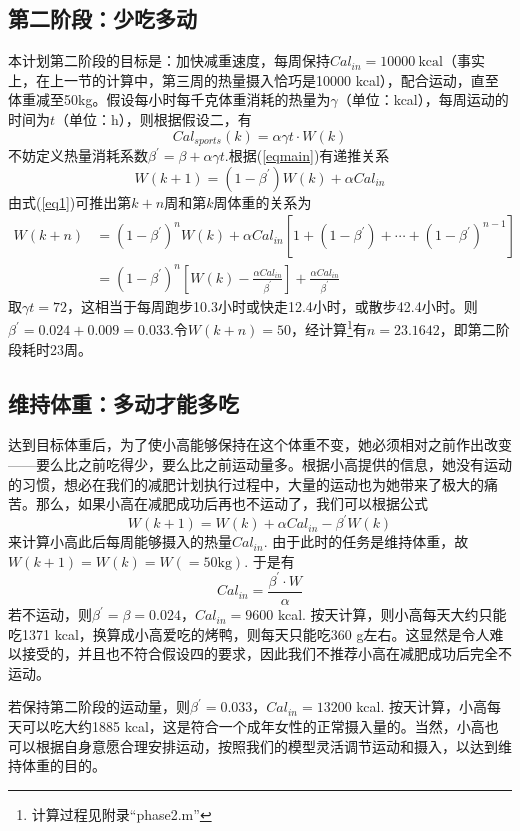 \documentclass[a4paper,12pt,onecolumn,twoside]{article}
\begin{document}
\subsection{第二阶段：少吃多动}\label{sensi:phase2}
本计划第二阶段的目标是：加快减重速度，每周保持$Cal_{in}=10000~\text{kcal}$（事实上，在上一节的计算中，第三周的热量摄入恰巧是10000 kcal），配合运动，直至体重减至50kg。假设每小时每千克体重消耗的热量为$\gamma$（单位：kcal），每周运动的时间为$t$（单位：h），则根据假设二，有
\begin{equation}
	Cal_{sports}(k)=\alpha\gamma t\cdot W(k)
\end{equation}
不妨定义热量消耗系数$\beta^{\prime}=\beta+\alpha\gamma t. $根据(\ref{eqmain})有递推关系
\begin{equation}\label{eq1}
	W(k+1)=(1-\beta^{\prime})W(k)+\alpha Cal_{in}
\end{equation}
由式(\ref{eq1})可推出第$k+n$周和第$k$周体重的关系为
\begin{equation}\label{sensi:2}
	\begin{aligned}
		W(k+n)&=(1-\beta^{\prime})^{n}W(k)+\alpha Cal_{in}[1+(1-\beta^{\prime})+\cdots+(1-\beta^{\prime})^{n-1}]\\
		&=(1-\beta^{\prime})^{n}[W(k)-\frac{\alpha Cal_{in}}{\beta^{\prime}}]+\frac{\alpha Cal_{in}}{\beta^{\prime}}
	\end{aligned}
\end{equation}
取$\gamma t=72$，这相当于每周跑步10.3小时或快走12.4小时，或散步42.4小时。则$\beta^{\prime}=0.024+0.009=0.033$.令$W(k+n)=50$，经计算\footnote{计算过程见附录“phase2.m”}有$n=23.1642$，即第二阶段耗时23周。

\subsection{维持体重：多动才能多吃}
达到目标体重后，为了使小高能够保持在这个体重不变，她必须相对之前作出改变——要么比之前吃得少，要么比之前运动量多。根据小高提供的信息，她没有运动的习惯，想必在我们的减肥计划执行过程中，大量的运动也为她带来了极大的痛苦。那么，如果小高在减肥成功后再也不运动了，我们可以根据公式
\begin{equation}
	W(k+1)=W(k)+\alpha Cal_{in}-\beta^{\prime}W(k)
\end{equation}
来计算小高此后每周能够摄入的热量$Cal_{in}.$ 由于此时的任务是维持体重，故$W(k+1)=W(k)=W(=50\text{kg}).$ 于是有
\begin{equation}
	Cal_{in}=\frac{\beta^{\prime}\cdot W}{\alpha}
\end{equation}
若不运动，则$\beta^{\prime}=\beta=0.024$，$Cal_{in}=9600$ kcal. 按天计算，则小高每天大约只能吃1371 kcal，换算成小高爱吃的烤鸭，则每天只能吃360 g左右。这显然是令人难以接受的，并且也不符合假设四的要求，因此我们不推荐小高在减肥成功后完全不运动。 \par
若保持第二阶段的运动量，则$\beta^{\prime}=0.033$，$Cal_{in}=13200$ kcal. 按天计算，小高每天可以吃大约1885 kcal，这是符合一个成年女性的正常摄入量的。当然，小高也可以根据自身意愿合理安排运动，按照我们的模型灵活调节运动和摄入，以达到维持体重的目的。
\end{document}

